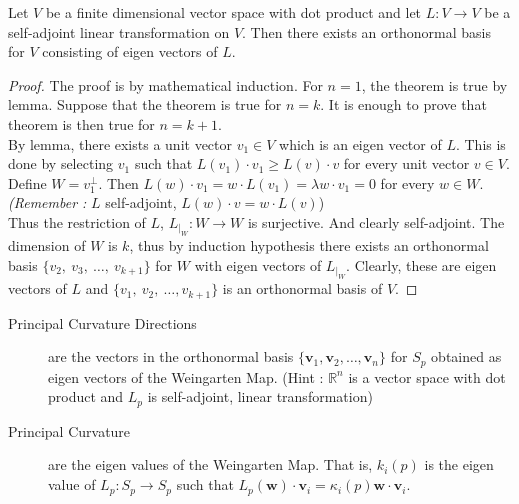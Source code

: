\begin{theorem}
	Let $V$ be a finite dimensional vector space with dot product and let $L : V \to V$ be a self-adjoint linear transformation on $V$.
	Then there exists an orthonormal basis for $V$ consisting of eigen vectors of $L$.
\end{theorem}
\begin{proof}
	The proof is by mathematical induction.
	For $n=1$, the theorem is true by lemma.%
	Suppose that the theorem is true for $n = k$.
	It is enough to prove that theorem is then true for $n=k+1$.\\


	By lemma, there exists a unit vector $v_1 \in V$ which is an eigen vector of $L$.
	This is done by selecting $v_1$ such that $L(v_1) \cdot v_1 \ge L(v) \cdot v$ for every unit vector $v \in V$.
	Define $W = v_1^\perp$.
	Then $L(w) \cdot v_1 = w \cdot L(v_1) = \lambda w \cdot v_1 = 0$ for every $w \in W$.
	\textit{(Remember :}
	$L$ self-adjoint, $L(w) \cdot v = w \cdot L(v)$)\\


	Thus the restriction of $L$, $L_{|_W} : W \to W$ is surjective.
	And clearly self-adjoint.
	The dimension of $W$ is $k$, thus by induction hypothesis there exists an orthonormal basis $\{ v_2,\ v_3,\ \dots,\ v_{k+1} \}$ for $W$ with eigen vectors of $L_{|_W}$.
	Clearly, these are eigen vectors of $L$ and $\{ v_1,\ v_2,\ \dots, v_{k+1} \}$ is an orthonormal basis of $V$.
\end{proof}

\begin{description}
	\item[Principal Curvature Directions] are the vectors in the orthonormal basis $\{ \mathbf{v}_1,\mathbf{v}_2,\dots,\mathbf{v}_n \}$ for $S_p$ obtained as eigen vectors of the Weingarten Map.
		(Hint : $\mathbb{R}^n$ is a vector space with dot product and $L_p$ is self-adjoint, linear transformation)
	\item[Principal Curvature] are the eigen values of the Weingarten Map.
		That is, $k_i(p)$ is the eigen value of $L_p : S_p \to S_p$ such that $L_p(\mathbf{w}) \cdot \mathbf{v}_i = \kappa_i(p) \mathbf{w} \cdot \mathbf{v}_i$.
\end{description}

